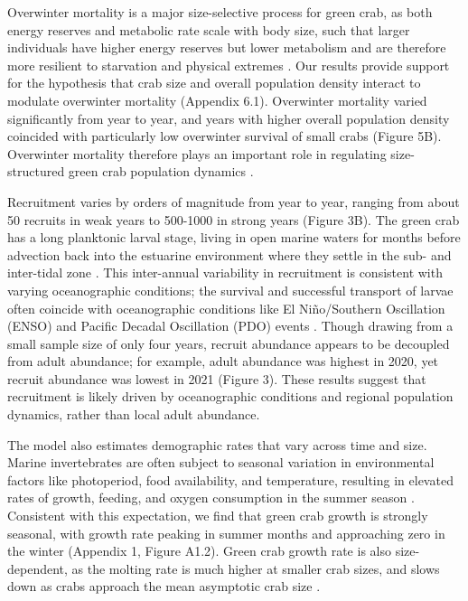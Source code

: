 \documentclass{article}
\begin{document}
Overwinter mortality is a major size-selective process for green crab, as both energy reserves and metabolic rate scale with body size, such that larger individuals have higher energy reserves but lower metabolism and are therefore more resilient to starvation and physical extremes \parencite{carlson2008seasonal, sogard1997size}. Our results provide support for the hypothesis that crab size and overall population density interact to modulate overwinter mortality (Appendix 6.1). Overwinter mortality varied significantly from year to year, and years with higher overall population density coincided with particularly low overwinter survival of small crabs (Figure 5B). Overwinter mortality therefore plays an important role in regulating size-structured green crab population dynamics \parencite{henderson1988size}. 

Recruitment varies by orders of magnitude from year to year, ranging from about 50 recruits in weak years to 500-1000 in strong years (Figure 3B). The green crab has a long planktonic larval stage, living in open marine waters for months before advection back into the estuarine environment where they settle in the sub- and inter-tidal zone \parencite{yamada2001global}. This inter-annual variability in recruitment is consistent with varying oceanographic conditions; the survival and successful transport of larvae often coincide with oceanographic conditions like El Niño/Southern Oscillation (ENSO) and Pacific Decadal Oscillation (PDO) events \parencite{yamada2021ocean}. Though drawing from a small sample size of only four years, recruit abundance appears to be decoupled from adult abundance; for example, adult abundance was highest in 2020, yet recruit abundance was lowest in 2021 (Figure 3). These results suggest that recruitment is likely driven by oceanographic conditions and regional population dynamics, rather than local adult abundance. 

The model also estimates demographic rates that vary across time and size. Marine invertebrates are often subject to seasonal variation in environmental factors like photoperiod, food availability, and temperature, resulting in elevated rates of growth, feeding, and oxygen consumption in the summer season \parencite{brockington2001relative}. Consistent with this expectation, we find that green crab growth is strongly seasonal, with growth rate peaking in summer months and approaching zero in the winter (Appendix 1, Figure A1.2). Green crab growth rate is also size-dependent, as the molting rate is much higher at smaller crab sizes, and slows down as crabs approach the mean asymptotic crab size \parencite{yamada2005growth}.
\end{document}
